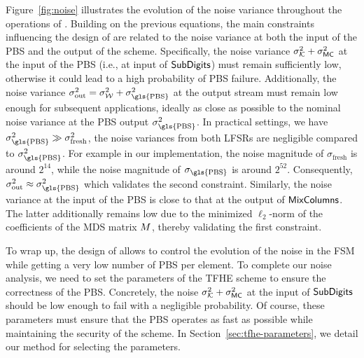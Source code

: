 Figure~\ref{fig:noise} illustrates the evolution of the noise variance throughout the operations of \coolName.
Building on the previous equations, the main constraints influencing the design of \coolName are related to the noise variance at both the input of the \gls{PBS} and the output of the scheme. Specifically, the noise variance $\sigma_{\mathcal{K}}^2+\sigma^2_{\text{\textsf{MC}}}$ at the input of the \gls{PBS} (i.e., at input of $\text{\textsf{SubDigits}}$) must remain sufficiently low, otherwise it could lead to a high probability of \gls{PBS} failure. Additionally, the noise variance $\sigma^2_{\text{out}}  = \sigma_\whitening^2 + \sigma_{\text{\gls{PBS}}}^2$ at the output stream must remain low enough for subsequent applications, ideally as close as possible to the nominal noise variance at the \gls{PBS} output $\sigma_{\text{\gls{PBS}}}^2$. In practical settings, we have $\sigma_{\text{\gls{PBS}}}^2 \gg \sigma_{\text{fresh}}^2$, the noise variances from both LFSRs are negligible compared to $\sigma_{\text{\gls{PBS}}}^2$. For example in our implementation, the noise magnitude of $\sigma_{\text{fresh}}$ is around $2^{14}$, while the noise magnitude of $\sigma_{\text{\gls{PBS}}}$ is around $2^{52}$. Consequently, $\sigma^2_{\text{out}} \approx \sigma_{\text{\gls{PBS}}}^2$ which validates the second constraint. Similarly, the noise variance at the input of the \gls{PBS} is close to that at the output of $\text{\textsf{MixColumns}}$. The latter additionally remains low due to the minimized $\ell_2$-norm of the coefficients of the MDS matrix $M$, thereby validating the first constraint.


To wrap up, the design of \coolName{} allows to control the evolution of the noise in the FSM while getting a very low number of \gls{PBS} per element. To complete our noise analysis, we need to set the parameters of the \gls{TFHE} scheme to ensure the correctness of the \gls{PBS}. Concretely, the noise \( \sigma_{\mathcal{K}}^2 + \sigma^2_{\text{\textsf{MC}}} \) at the input of \( \text{\textsf{SubDigits}} \) should be low enough to fail with a negligible probability. Of course, these parameters must ensure that the \gls{PBS} operates as fast as possible while maintaining the security of the scheme. In Section~\ref{sec:tfhe-parameters}, we detail our method for selecting the parameters.









